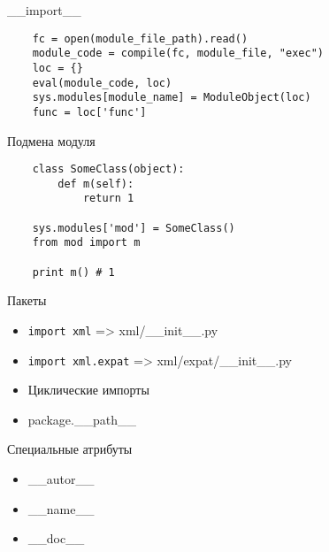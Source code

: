 \documentclass{article}
\begin{document}
\begin{center} \_\_import\_\_ \end{center}
\begin{lstlisting}
	fc = open(module_file_path).read()
	module_code = compile(fc, module_file, "exec")
	loc = {}
	eval(module_code, loc)
	sys.modules[module_name] = ModuleObject(loc)
	func = loc['func']
\end{lstlisting}
\newpage

\begin{center} Подмена модуля \end{center}
\begin{lstlisting}
	class SomeClass(object):
		def m(self):
			return 1

	sys.modules['mod'] = SomeClass()
	from mod import m

	print m() # 1
\end{lstlisting}
\newpage


\begin{center} Пакеты \end{center}
\begin{itemize}
	\item \lstinline!import xml! => xml/\_\_init\_\_.py
	\item \lstinline!import xml.expat! => xml/expat/\_\_init\_\_.py
	\item Циклические импорты
	\item package.\_\_path\_\_
\end{itemize}
\newpage

\begin{center} Специальные атрибуты \end{center}
\begin{itemize}
	\item \_\_autor\_\_
	\item \_\_name\_\_
	\item \_\_doc\_\_
\end{itemize}
\end{document}
